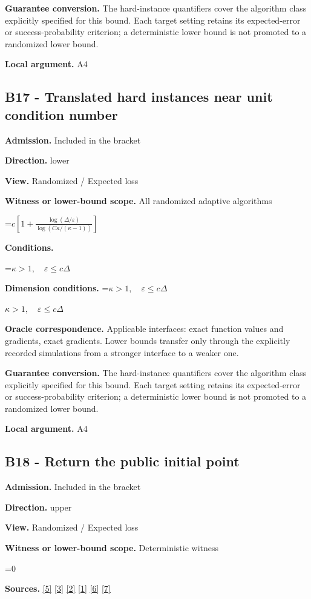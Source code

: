 \documentclass[10pt,a4paper]{article}
\newcommand{\AtlasMath}[1]{\par\begingroup\centering\setbox0=\hbox{$\displaystyle #1$}\ifdim\wd0>1.4\linewidth\typeout{ATLAS WIDE FORMULA: \the\wd0}\fi\ifdim\wd0>\linewidth\resizebox{\linewidth}{!}{\box0}\else\box0\fi\par\endgroup}
\newcommand{\AtlasInlineMath}[1]{\begingroup\setbox0=\hbox{$#1$}\ifdim\wd0>.4\linewidth\endgroup\AtlasMath{#1}\else\endgroup$#1$\fi}
\begin{document}
\textbf{Guarantee conversion.} The hard-instance quantifiers cover the algorithm class explicitly specified for this bound. Each target setting retains its expected-error or success-probability criterion; a deterministic lower bound is not promoted to a randomized lower bound.

\textbf{Local argument.} A4

\subsection{B17 - Translated hard instances near unit condition number}
\textbf{Admission.} Included in the bracket

\textbf{Direction.} lower

\textbf{View.} Randomized / Expected loss

\textbf{Witness or lower-bound scope.} All randomized adaptive algorithms

\AtlasMath{c\left[1+\frac{\log(\Delta/\varepsilon)}{\log(C\kappa/(\kappa-1))}\right]}
\textbf{Conditions.} 
\AtlasMath{\kappa>1,\quad\varepsilon\le c\Delta}


\textbf{Dimension conditions.} \AtlasInlineMath{\kappa>1,\quad\varepsilon\le c\Delta}

\textbf{Oracle correspondence.} Applicable interfaces: exact function values and gradients, exact gradients. Lower bounds transfer only through the explicitly recorded simulations from a stronger interface to a weaker one.

\textbf{Guarantee conversion.} The hard-instance quantifiers cover the algorithm class explicitly specified for this bound. Each target setting retains its expected-error or success-probability criterion; a deterministic lower bound is not promoted to a randomized lower bound.

\textbf{Local argument.} A4

\subsection{B18 - Return the public initial point}
\textbf{Admission.} Included in the bracket

\textbf{Direction.} upper

\textbf{View.} Randomized / Expected loss

\textbf{Witness or lower-bound scope.} Deterministic witness

\AtlasMath{0}
\textbf{Sources.} \href{https://arxiv.org/pdf/2101.09740v2}{[5]} \href{https://arxiv.org/pdf/2609.33360v2}{[3]} \href{https://arxiv.org/pdf/2609.10874}{[2]} \href{https://arxiv.org/pdf/1405.4980}{[1]} \href{https://www2.isye.gatech.edu/~nemirovs/MOR_AccuracyCertificates.pdf}{[6]} \href{https://arxiv.org/pdf/2609.20701}{[7]}
\end{document}

